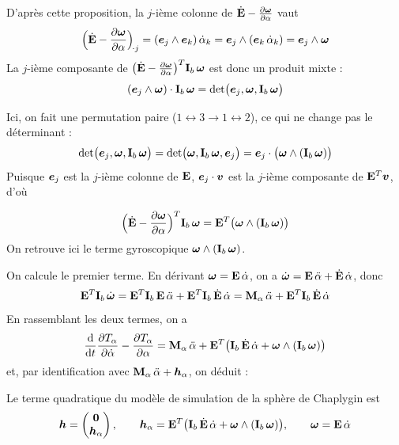 D'après cette proposition, la $j$-ième colonne de
$\dot{\mathbf{E}} - \frac{\partial \bm{\omega}}{\partial \alpha}$ vaut
\[
    \Bigl(\dot{\mathbf{E}} - \frac{\partial \bm{\omega}}{\partial \alpha}\Bigr)_{\!\cdot j}
    = (\bm{e}_j\wedge\bm{e}_k)\,\dot\alpha_k
    = \bm{e}_j\wedge(\bm{e}_k\,\dot\alpha_k)
    = \bm{e}_j\wedge\bm{\omega}
\]
La $j$-ième composante de
$\bigl(\dot{\mathbf{E}} - \frac{\partial \bm{\omega}}{\partial \alpha}\bigr)^T
\mathbf{I}_b\,\bm{\omega}$ est donc un produit mixte :
\[
    (\bm{e}_j\wedge\bm{\omega})\cdot\mathbf{I}_b\,\bm{\omega}
    = \det\bigl(\bm{e}_j,\bm{\omega},\mathbf{I}_b\,\bm{\omega}\bigr)
\]

Ici, on fait une permutation paire ($1 \leftrightarrow 3 \longrightarrow 1 \leftrightarrow 2$), ce qui ne change pas le déterminant : 
\[
    \det\bigl(\bm{e}_j,\bm{\omega},\mathbf{I}_b\,\bm{\omega}\bigr)
    = \det\bigl(\bm{\omega},\mathbf{I}_b\,\bm{\omega},\bm{e}_j\bigr)
    = \bm{e}_j\cdot\bigl(\bm{\omega}\wedge(\mathbf{I}_b\,\bm{\omega})\bigr)
\]
Puisque $\bm{e}_j$ est la $j$-ième colonne de $\mathbf{E}$,
$\bm{e}_j\cdot\bm{v}$ est la $j$-ième composante de
$\mathbf{E}^T\bm{v}$, d'où

\[
    \Bigl(\dot{\mathbf{E}} - \frac{\partial \bm{\omega}}{\partial \alpha}\Bigr)^T
    \mathbf{I}_b\,\bm{\omega}
    = \mathbf{E}^T\bigl(\bm{\omega}\wedge(\mathbf{I}_b\,\bm{\omega})\bigr)
\]
On retrouve ici le terme gyroscopique
$\bm{\omega}\wedge(\mathbf{I}_b\,\bm{\omega})$.

On calcule le premier terme. En dérivant $\bm{\omega} = \mathbf{E}\,\dot\alpha$,
on a $\dot{\bm{\omega}} = \mathbf{E}\,\ddot\alpha + \dot{\mathbf{E}}\,\dot\alpha$,
donc
\[
    \mathbf{E}^T\mathbf{I}_b\,\dot{\bm{\omega}}
    = \mathbf{E}^T\mathbf{I}_b\,\mathbf{E}\,\ddot\alpha
    + \mathbf{E}^T\mathbf{I}_b\,\dot{\mathbf{E}}\,\dot\alpha
    = \mathbf{M}_\alpha\,\ddot\alpha
    + \mathbf{E}^T\mathbf{I}_b\,\dot{\mathbf{E}}\,\dot\alpha
\]
En rassemblant les deux termes, on a
\[
    \frac{\mathrm{d}}{\mathrm{d} t}\frac{\partial T_\alpha}{\partial \dot\alpha} - \frac{\partial T_\alpha}{\partial \alpha}
    = \mathbf{M}_\alpha\,\ddot\alpha
    + \mathbf{E}^T\bigl(\mathbf{I}_b\,\dot{\mathbf{E}}\,\dot\alpha
    + \bm{\omega}\wedge(\mathbf{I}_b\,\bm{\omega})\bigr)
\]
et, par identification avec $\mathbf{M}_\alpha\,\ddot\alpha + \bm{h}_\alpha$,
on déduit : 

\begin{proposition}
    Le terme quadratique du modèle de simulation de la sphère de Chaplygin est
    \[
        \bm{h} = \begin{pmatrix} \bm{0}\\ \bm{h}_\alpha \end{pmatrix},
        \qquad
        \bm{h}_\alpha = \mathbf{E}^T\bigl(\mathbf{I}_b\,\dot{\mathbf{E}}\,\dot\alpha
        + \bm{\omega}\wedge(\mathbf{I}_b\,\bm{\omega})\bigr),
        \qquad
        \bm{\omega} = \mathbf{E}\,\dot\alpha
    \]
\end{proposition}

